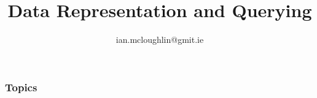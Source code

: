 \documentclass[dvipsnames]{beamer}
\begin{document}
  \title{Data Representation and Querying}
  \subtitle{}
  \author{ian.mcloughlin@gmit.ie}
  \date{}

  \begin{frame}
    \titlepage
  \end{frame}

  \begin{frame}
    \frametitle{Topics}
    \tableofcontents
  \end{frame}

  
  
  
  
\end{document}
